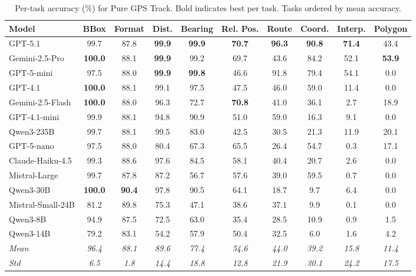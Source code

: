 \begin{table}[htbp]
\centering
\caption{Per-task accuracy (\%) for Pure GPS Track. Bold indicates best per task. Tasks ordered by mean accuracy.}
\label{tab:per_task_pure_gps}
\small
\begin{tabular}{lccccccccc}
\toprule
\textbf{Model} & \textbf{BBox} & \textbf{Format} & \textbf{Dist.} & \textbf{Bearing} & \textbf{Rel. Pos.} & \textbf{Route} & \textbf{Coord.} & \textbf{Interp.} & \textbf{Polygon} \\
\midrule
GPT-5.1 & 99.7 & 87.8 & \textbf{99.9} & \textbf{99.9} & \textbf{70.7} & \textbf{96.3} & \textbf{90.8} & \textbf{71.4} & 43.4 \\
Gemini-2.5-Pro & \textbf{100.0} & 88.1 & \textbf{99.9} & 99.2 & 69.7 & 43.6 & 84.2 & 52.1 & \textbf{53.9} \\
GPT-5-mini & 97.5 & 88.0 & \textbf{99.9} & \textbf{99.8} & 46.6 & 91.8 & 79.4 & 54.1 & 0.0 \\
GPT-4.1 & \textbf{100.0} & 88.1 & 99.1 & 97.5 & 47.5 & 46.0 & 59.0 & 11.4 & 0.0 \\
Gemini-2.5-Flash & \textbf{100.0} & 88.0 & 96.3 & 72.7 & \textbf{70.8} & 41.0 & 36.1 & 2.7 & 18.9 \\
GPT-4.1-mini & 99.9 & 88.1 & 94.8 & 90.9 & 51.0 & 59.0 & 16.3 & 9.1 & 0.0 \\
Qwen3-235B & 99.7 & 88.1 & 99.5 & 83.0 & 42.5 & 30.5 & 21.3 & 11.9 & 20.1 \\
GPT-5-nano & 97.5 & 88.0 & 80.4 & 67.3 & 65.5 & 26.4 & 54.7 & 0.3 & 17.1 \\
Claude-Haiku-4.5 & 99.3 & 88.6 & 97.6 & 84.5 & 58.1 & 40.4 & 20.7 & 2.6 & 0.0 \\
Mistral-Large & 99.7 & 87.8 & 87.2 & 56.7 & 57.6 & 39.0 & 59.5 & 0.7 & 0.0 \\
Qwen3-30B & \textbf{100.0} & \textbf{90.4} & 97.8 & 90.5 & 64.1 & 18.7 & 9.7 & 6.4 & 0.0 \\
Mistral-Small-24B & 81.2 & 89.8 & 75.3 & 47.1 & 38.6 & 37.1 & 9.9 & 0.1 & 0.0 \\
Qwen3-8B & 94.9 & 87.5 & 72.5 & 63.0 & 35.4 & 28.5 & 10.9 & 0.9 & 1.5 \\
Qwen3-14B & 79.2 & 83.1 & 54.2 & 57.9 & 50.4 & 32.5 & 6.0 & 1.6 & 4.2 \\
\midrule
\textit{Mean} & \textit{96.4} & \textit{88.1} & \textit{89.6} & \textit{77.4} & \textit{54.6} & \textit{44.0} & \textit{39.2} & \textit{15.8} & \textit{11.4} \\
\textit{Std} & \textit{6.5} & \textit{1.8} & \textit{14.4} & \textit{18.8} & \textit{12.8} & \textit{21.9} & \textit{30.1} & \textit{24.2} & \textit{17.5} \\
\bottomrule
\end{tabular}
\end{table}

